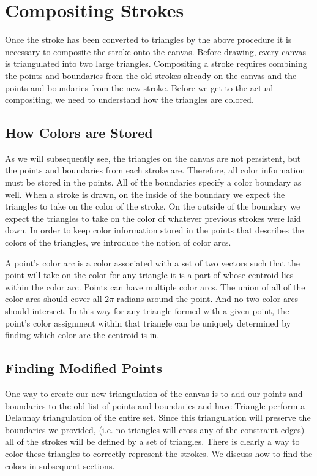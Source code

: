 \documentclass[conference]{acmsiggraph}
\begin{document}
\section{Compositing Strokes}
Once the stroke has been converted to triangles by the above procedure it is necessary to
composite the stroke onto the canvas. Before drawing, every canvas is triangulated
into two large triangles. Compositing a stroke requires combining the points and boundaries
from the old strokes already on the canvas and the points and boundaries from the new stroke.
Before we get to the actual compositing, we need to understand how the triangles are colored.

\subsection{How Colors are Stored}
As we will subsequently see, the triangles on the canvas are not persistent, but the
points and boundaries from each stroke are. Therefore, all color information must be
stored in the points. All of the boundaries specify a color boundary as well. When a
stroke is drawn, on the inside of the boundary we expect the triangles to take on the
color of the stroke. On the outside of the boundary we expect the triangles to take
on the color of whatever previous strokes were laid down. In order to keep color information
stored in the points that describes the colors of the triangles, we introduce the
notion of color arcs. 

A point's color arc is a color associated with a set of two vectors such that the point 
will take on the color for any triangle it is a part of whose centroid lies within the 
color arc. Points can have multiple color arcs. The union of all of the color arcs should
cover all $2\pi$ radians around the point. And no two color arcs should intersect.
In this way for any triangle formed with a given point, the point's color assignment within
that triangle can be uniquely determined by finding which color arc the centroid is in. 

\subsection{Finding Modified Points}
One way to create our new triangulation of the canvas is to add our points and boundaries
to the old list of points and boundaries and have Triangle perform a Delaunay triangulation
of the entire set. Since this triangulation will preserve the boundaries we provided,
(i.e. no triangles will cross any of the constraint edges) all of the strokes will be
defined by a set of triangles. There is clearly a way to color these triangles to
correctly represent the strokes. We discuss how to find the colors in subsequent sections.
\end{document}
